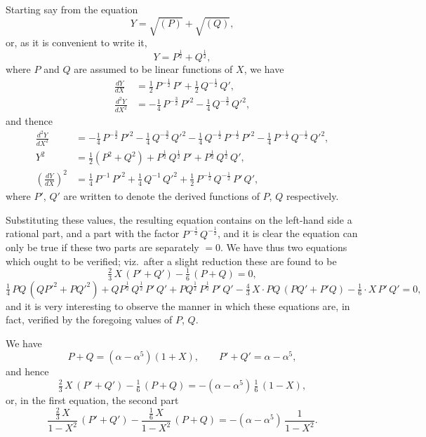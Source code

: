 \documentclass[11pt]{article}
\begin{document}
\noindent
Starting say from the equation
\[
   Y = \sqrt{(P)} + \sqrt{(Q)},
\]
or, as it is convenient to write it,
\[
   Y = P^{\frac{1}{2}} + Q^{\frac{1}{2}},
\]
where $P$ and $Q$ are assumed to be linear functions of $X$, we have
\begin{align*}
\frac{dY}{dX} &= \tfrac{1}{2}\,P^{-\tfrac{1}{2}}\,P' + \tfrac{1}{2}\,Q^{-\tfrac{1}{2}}\,Q',\\
\frac{d^2 Y}{dX^2} &= -\tfrac{1}{4}\,P^{-\tfrac{3}{2}}\,P'^2 - \tfrac{1}{4}\,Q^{-\tfrac{3}{2}}\,Q'^2,
\end{align*}
and thence
\begin{align*}
\frac{d^2 Y}{dX^2}
 &= -\tfrac{1}{4}\,P^{-\tfrac{3}{2}}\,P'^2 - \tfrac{1}{4}\,Q^{-\tfrac{3}{2}}\,Q'^2 - \tfrac{1}{4}\,Q^{-\tfrac{1}{2}}\,P^{-\tfrac{1}{2}}\,P'^2 - \tfrac{1}{4}\,P^{-\tfrac{1}{2}}\,Q^{-\tfrac{1}{2}}\,Q'^2,\\
Y^2 &= \tfrac{1}{2}(P^2 + Q^2) + P^{\tfrac{1}{2}}\,Q^{\tfrac{1}{2}}\,P' + P^{\tfrac{1}{2}}\,Q^{\tfrac{1}{2}}\,Q',\\
\left(\frac{dY}{dX}\right)^{\!2} &= \tfrac{1}{4}\,P^{-1}\,P'^2 + \tfrac{1}{4}\,Q^{-1}\,Q'^2 + \tfrac{1}{2}\,P^{-\tfrac{1}{2}}\,Q^{-\tfrac{1}{2}}\,P'\,Q',
\end{align*}
where $P'$, $Q'$ are written to denote the derived functions of $P$, $Q$ respectively.

Substituting these values, the resulting equation contains on the left-hand side
a rational part, and a part with the factor $P^{-\tfrac{1}{2}}\,Q^{-\tfrac{1}{2}}$, and it is clear the equation
can only be true if these two parts are separately $= 0$. We have thus two equations
which ought to be verified; viz.\ after a slight reduction these are found to be
\[
   \tfrac{2}{3}\,X\,(P' + Q') - \tfrac{1}{6}\,(P + Q) = 0,
\]
\[
   \tfrac{1}{4}\,PQ\,(Q P'^2 + P Q'^2) + Q P^{\tfrac{1}{2}}\,Q^{\tfrac{1}{2}}\,P'\,Q' + P Q^{\tfrac{1}{2}}\,P^{\tfrac{1}{2}}\,P'\,Q' - \tfrac{4}{3}\,X\cdot P Q\,(P Q' + P' Q) - \tfrac{1}{6}\cdot X\,P'\,Q' = 0,
\]
and it is very interesting to observe the manner in which these equations are, in
fact, verified by the foregoing values of $P$, $Q$.

We have
\[
   P + Q = (\alpha - \alpha^5)(1 + X),\qquad P' + Q' = \alpha - \alpha^5,
\]
and hence
\[
   \tfrac{2}{3}\,X\,(P' + Q') - \tfrac{1}{6}\,(P + Q) = -(\alpha - \alpha^5)\,\tfrac{1}{6}\,(1 - X),
\]
or, in the first equation, the second part
\[
   \frac{\tfrac{2}{3}\,X}{1 - X^2}\,(P' + Q') - \frac{\tfrac{1}{6}\,X}{1 - X^2}\,(P + Q)
   = -(\alpha - \alpha^5)\,\frac{1}{1 - X^2}.
\]
\end{document}
